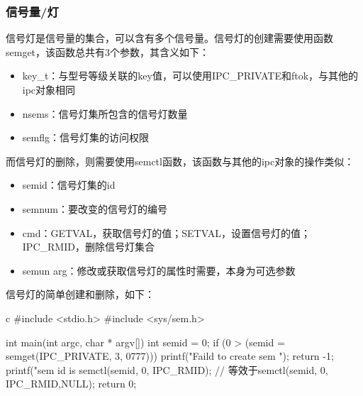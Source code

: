 \subsubsection{信号量/灯}
信号灯是信号量的集合，可以含有多个信号量。信号灯的创建需要使用函数semget，该函数总共有3个参数，其含义如下：
\begin{itemize}
  \item key\_t：与型号等级关联的key值，可以使用IPC\_PRIVATE和ftok，与其他的ipc对象相同
  \item nsems：信号灯集所包含的信号灯数量
  \item semflg：信号灯集的访问权限
\end{itemize}
而信号灯的删除，则需要使用semctl函数，该函数与其他的ipc对象的操作类似：
\begin{itemize}
  \item semid：信号灯集的id
  \item semnum：要改变的信号灯的编号
  \item cmd：GETVAL，获取信号灯的值；SETVAL，设置信号灯的值；IPC\_RMID，删除信号灯集合
  \item semun arg：修改或获取信号灯的属性时需要，本身为可选参数
\end{itemize}
信号灯的简单创建和删除，如下：
\begin{code-block}{c}
#include <stdio.h>
#include <sys/sem.h>

int main(int argc, char * argv[])
{
        int semid = 0;
        if (0 > (semid = semget(IPC_PRIVATE, 3, 0777)))
        {
                printf("Faild to create sem \n");
                return -1;
        }
        printf("sem id is %
        semctl(semid, 0, IPC_RMID); // 等效于semctl(semid, 0, IPC_RMID,NULL);
        return 0;
}
\end{code-block}

